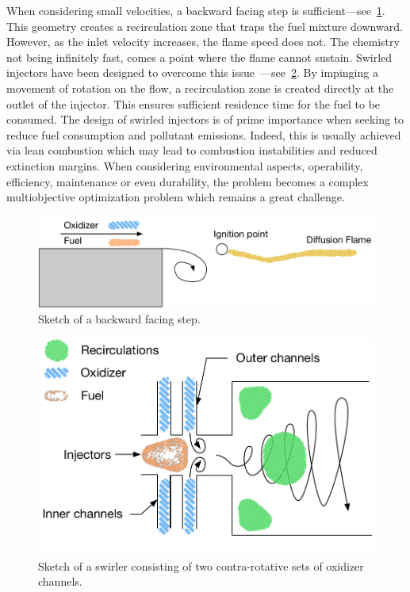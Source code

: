  When considering small velocities, a backward facing step is sufficient---see~\cref{fig:sketch-step}. This geometry creates a recirculation zone that traps the fuel mixture downward. However, as the inlet velocity increases, the flame speed does not. The chemistry not being infinitely fast, comes a point where the flame cannot sustain. Swirled injectors have been designed to overcome this issue~\cite{Lilley1977}---see~\cref{fig:sketch-swirler}. By impinging a movement of rotation on the flow, a recirculation zone is created directly at the outlet of the injector. This ensures sufficient residence time for the fuel to be consumed. The design of swirled injectors is of prime importance when seeking to reduce fuel consumption and pollutant emissions. Indeed, this is usually achieved via lean combustion which may lead to combustion instabilities and reduced extinction margins. When considering environmental aspects, operability, efficiency, maintenance or even durability, the problem becomes a complex multiobjective optimization problem which remains a great challenge.

\begin{figure}[!ht]
\centering
\includegraphics[width=\linewidth,keepaspectratio]{fig/applications/swirler/sketch_step.pdf}
\caption{Sketch of a backward facing step.}
\label{fig:sketch-step}
\end{figure}

\begin{figure}[!ht]
\centering
\includegraphics[width=0.9\linewidth,keepaspectratio]{fig/applications/swirler/sketch_swirler.pdf}
\caption{Sketch of a swirler consisting of two contra-rotative sets of oxidizer channels.}
\label{fig:sketch-swirler}
\end{figure}

